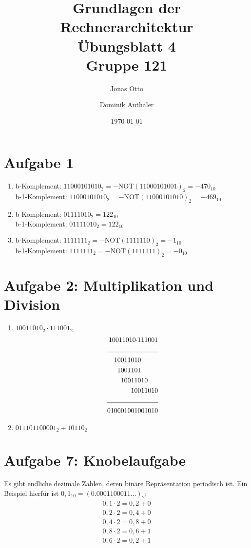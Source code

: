 \documentclass[a4paper]{article}
\title{Grundlagen der Rechnerarchitektur\\ Übungsblatt 4\\Gruppe 121\\}
\author{Jonas Otto\and Dominik Authaler}
\date{\today}
\begin{document}
\maketitle

\section*{Aufgabe 1}
\begin{enumerate}[label=\alph*)]
\item b-Komplement: $11000101010_2 = -\text{NOT}(11000101001)_2 = -470_{10}$ \\
      b-1-Komplement: $11000101010_2 = -\text{NOT}(11000101010)_2 = -469_{10}$
\item b-Komplement: $01111010_2 = 122_{10}$ \\
      b-1-Komplement: $01111010_2 = 122_{10}$
\item b-Komplement: $1111111_2 = -\text{NOT}(1111110)_2 = -1_{10}$ \\
      b-1-Komplement: $1111111_2 = -\text{NOT}(1111111)_2 = -0_{10}$
\end{enumerate}

\section*{Aufgabe 2: Multiplikation und Division}
\begin{enumerate}[label=\alph*)]
\item $10011010_2 \cdot 111001_2$\\
    \begin{equation}
    \begin{split}
        10011010 \cdot &111001\\
        \cline{1-2}
                1001101&0\\
                 100110&1\\
                  10011&010\\
                     10&011010\\
        \cline{1-2}
              010001001&001010\\
    \end{split}
    \end{equation}
\item $011101100001_2 \div 10110_2$
\end{enumerate}

\section*{Aufgabe 7: Knobelaufgabe}
Es gibt endliche dezimale Zahlen, deren binäre Repräsentation periodisch ist. Ein Beispiel hierfür ist $0,1_{10} = (0.0001100011...)_2:$
\begin{align*}
	0,1 \cdot 2 = 0,2 + 0 \\
	0,2 \cdot 2 = 0,4 + 0 \\
	0,4 \cdot 2 = 0,8 + 0 \\
	0,8 \cdot 2 = 0,6 + 1 \\
	0,6 \cdot 2 = 0,2 + 1
\end{align*}
\end{document}
